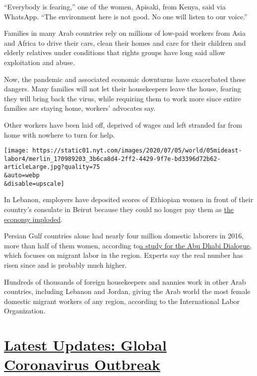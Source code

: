 ``Everybody is fearing,'' one of the women, Apisaki, from Kenya, said
via WhatsApp. ``The environment here is not good. No one will listen to
our voice.''

Families in many Arab countries rely on millions of low-paid workers
from Asia and Africa to drive their cars, clean their homes and care for
their children and elderly relatives under conditions that rights groups
have long said allow exploitation and abuse.

Now, the pandemic and associated economic downturns have exacerbated
these dangers. Many families will not let their housekeepers leave the
house, fearing they will bring back the virus, while requiring them to
work more since entire families are staying home, workers' advocates
say.

Other workers have been laid off, deprived of wages and left stranded
far from home with nowhere to turn for help.

\texttt{[image: https://static01.nyt.com/images/2020/07/05/world/05mideast-labor4/merlin\_170989203\_3b6ca8d4-2ff2-4429-9f7e-bd3396d72b62-articleLarge.jpg?quality=75\\\&auto=webp\\\&disable=upscale]}

In Lebanon, employers have deposited scores of Ethiopian women in front
of their country's consulate in Beirut because they could no longer pay
them as
\href{https://www.nytimes.com/2020/05/10/world/middleeast/lebanon-economic-crisis.html}{the
economy imploded}.

Persian Gulf countries alone had nearly four million domestic laborers
in 2016, more than half of them women, according
to\href{http://abudhabidialogue.org/sites/default/files/document-library/2018_Future\%20of\%20Domestic\%20Work\%20Study.pdf}{a
study for the Abu Dhabi Dialogue}, which focuses on migrant labor in the
region. Experts say the real number has risen since and is probably much
higher.

Hundreds of thousands of foreign housekeepers and nannies work in other
Arab countries, including Lebanon and Jordan, giving the Arab world the
most female domestic migrant workers of any region, according to the
International Labor Organization.

\hypertarget{latest-updates-global-coronavirus-outbreak}{%
\section{\texorpdfstring{\href{https://www.nytimes.com/2020/08/04/world/coronavirus-cases.html?action=click\&pgtype=Article\&state=default\&region=MAIN_CONTENT_1\&context=storylines_live_updates}{Latest
Updates: Global Coronavirus
Outbreak}}{Latest Updates: Global Coronavirus Outbreak}}\label{latest-updates-global-coronavirus-outbreak}}

